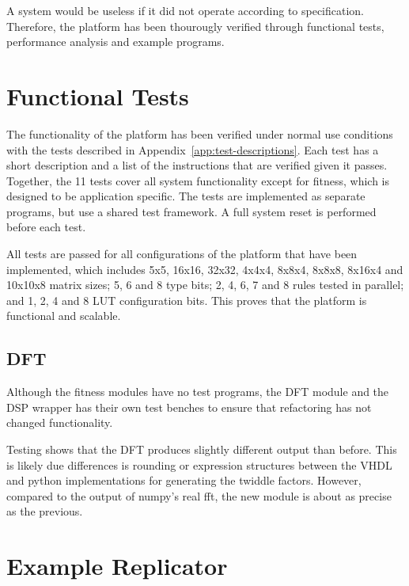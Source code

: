 A system would be useless if it did not operate according to specification.
Therefore, the platform has been thourougly verified through functional tests, performance analysis and example programs.


\section{Functional Tests}

The functionality of the platform has been verified under normal use conditions with the tests described in Appendix~\ref{app:test-descriptions}.
Each test has a short description and a list of the instructions that are verified given it passes.
Together, the 11 tests cover all system functionality except for fitness, which is designed to be application specific.
The tests are implemented as separate programs, but use a shared test framework.
A full system reset is performed before each test.

All tests are passed for all configurations of the platform that have been implemented, which includes 5x5, 16x16, 32x32, 4x4x4, 8x8x4, 8x8x8, 8x16x4 and 10x10x8 matrix sizes; 5, 6 and 8 type bits; 2, 4, 6, 7 and 8 rules tested in parallel; and 1, 2, 4 and 8 LUT configuration bits.
This proves that the platform is functional and scalable.

\subsection{DFT}

Although the fitness modules have no test programs, the DFT module and the DSP wrapper has their own test benches to ensure that refactoring has not changed functionality.

Testing shows that the DFT produces slightly different output than before.
This is likely due differences is rounding or expression structures between the VHDL and python implementations for generating the twiddle factors.
However, compared to the output of numpy's real fft, the new module is about as precise as the previous.



\section{Example Replicator}

